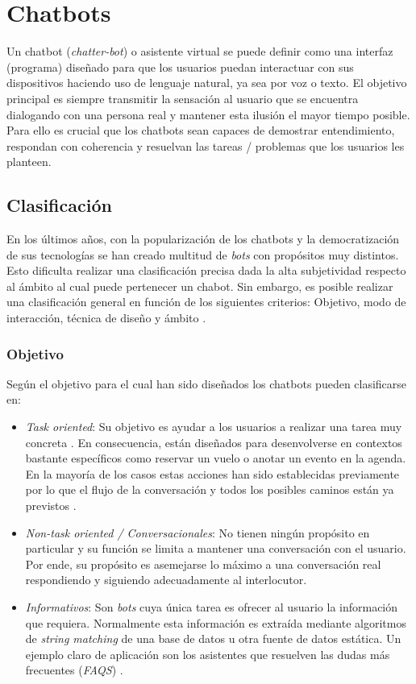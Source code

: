 \section{Chatbots}
Un chatbot (\textit{chatter-bot}) o asistente virtual se puede definir como una interfaz (programa) diseñado para que los usuarios puedan interactuar con sus dispositivos haciendo uso de lenguaje natural, ya sea por voz o texto. El objetivo principal es siempre transmitir la sensación al usuario que se encuentra dialogando con una persona real y mantener esta ilusión el mayor tiempo posible. Para ello es crucial que los chatbots sean capaces de demostrar entendimiento, respondan con coherencia y resuelvan las tareas / problemas que los usuarios les planteen.\\

\subsection{Clasificación}
En los últimos años, con la popularización de los chatbots y la democratización de sus tecnologías se han creado multitud de \textit{bots} con propósitos muy distintos. Esto dificulta realizar una clasificación precisa dada la alta subjetividad respecto  al ámbito al cual puede pertenecer un chabot. Sin embargo, es posible realizar una clasificación general en función de los siguientes criterios: Objetivo, modo de interacción, técnica de diseño y ámbito \cite{designTechniques,chatbotTypes}.\\

\subsubsection{Objetivo}
Según el objetivo para el cual han sido diseñados los chatbots pueden clasificarse en:

\begin{itemize}
  \item \textit{Task oriented}: Su objetivo es ayudar a los usuarios a realizar una tarea muy concreta \cite{designTechniques}. En consecuencia, están diseñados para desenvolverse en contextos bastante específicos como reservar un vuelo o anotar un evento en la agenda. En la mayoría de los casos estas acciones han sido establecidas previamente por lo que el flujo de la conversación y todos los posibles caminos están ya previstos \cite{chatbotTypes}.
  \item \textit {Non-task oriented / Conversacionales}: No tienen ningún propósito en particular y su función se limita a mantener una conversación con el usuario. Por ende, su propósito es asemejarse lo máximo a una conversación real respondiendo y siguiendo adecuadamente al interlocutor.
  \item \textit {Informativos}: Son \textit{bots} cuya única tarea es ofrecer al usuario la información que requiera. Normalmente esta información es extraída mediante algoritmos de \textit{string matching} de una base de datos u otra fuente de datos estática. Un ejemplo claro de aplicación son los asistentes que resuelven las dudas más frecuentes (\textit{FAQS}) \cite{chatbotTypes}.
\end{itemize}


